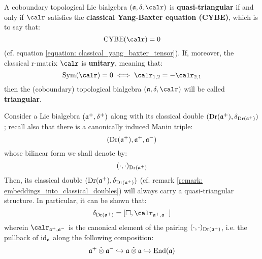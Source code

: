 \begin{definition} \label{def: (quasi)_triangular_topological_lie_algebras}
    A coboundary topological Lie bialgebra $(\a, \delta, \calr)$ is \textbf{quasi-triangular} if and only if $\calr$ satisfies the \textbf{classical Yang-Baxter equation (CYBE)}, which is to say that:
        \begin{equation} \label{equation: CYBEs}
            \CYBE(\calr) = 0
        \end{equation}
    (cf. equation \eqref{equation: classical_yang_baxter_tensor}). If, moreover, the classical r-matrix $\calr$ is \textbf{unitary}, meaning that:
        \begin{equation} \label{equation: unitary_classical_r_matrices}
            \Sym(\calr) = 0 \iff \calr_{1, 2} = -\calr_{2, 1}
        \end{equation}
    then the (coboundary) topological bialgebra $(\a, \delta, \calr)$ will be called \textbf{triangular}.
\end{definition}
\begin{example} \label{example: classical_doubles_are_quasi_triangular}
    Consider a Lie bialgebra $(\mathfrak{a}^+, \delta^+)$ along with its classical double $(\operatorname{Dr}(\mathfrak{a}^+), \delta_{\operatorname{Dr}(\mathfrak{a}^+)})$; recall also that there is a canonically induced Manin triple:
        $$( \operatorname{Dr}(\mathfrak{a}^+), \mathfrak{a}^+, \mathfrak{a}^- )$$
    whose bilinear form we shall denote by:
        $$(\cdot, \cdot)_{\operatorname{Dr}(\mathfrak{a}^+)}$$
    Then, its classical double $(\operatorname{Dr}(\mathfrak{a}^+), \delta_{\operatorname{Dr}(\mathfrak{a}^+)})$ (cf. remark \ref{remark: embeddings_into_classical_doubles}) will always carry a quasi-triangular structure. In particular, it can be shown that:
        \begin{equation} \label{equation: quasi_triangularity_of_classical_doubles}
            \delta_{\Dr(\a^+)} = [\Box, \calr_{\a^+, \a^-}]
        \end{equation}
    wherein $\calr_{\a^+, \a^-}$ is the canonical element of the pairing $(\cdot, \cdot)_{\operatorname{Dr}(\mathfrak{a}^+)}$, i.e. the pullback of $\mathrm{id}_{\mathfrak{a}}$ along the following composition:
        $$\a^+ \hattensor \a^- \hookrightarrow \a \hattensor \a \hookrightarrow \End(\a)$$
\end{example}